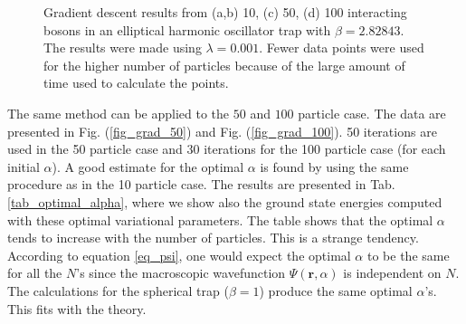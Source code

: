 \begin{figure}
{		}
\caption{Gradient descent results from (a,b) 10, (c) 50, (d) 100 interacting bosons in an elliptical harmonic oscillator trap with $\beta = 2.82843$. The results were made using $\lambda = 0.001$. Fewer data points were used for the higher number of particles because of the large amount of time used to calculate the points.}
\label{fig_grad_minima}
\end{figure}

The same method can be applied to the $50$ and $100$ particle case. The data are presented in Fig. (\ref{fig_grad_50}) and Fig. (\ref{fig_grad_100}). 50 iterations are used in the 50 particle case and 30 iterations for the 100 particle case (for each initial $\alpha$). A good estimate for the optimal $\alpha$ is found by using the same procedure as in the 10 particle case. The results are presented in Tab. \ref{tab_optimal_alpha}, where we show also the ground state energies computed with these optimal variational parameters. The table shows that the optimal $\alpha$ tends to increase with the number of particles. This is a strange tendency. According to equation \ref{eq_psi}, one would expect the optimal $\alpha$ to be the same for all the $N$'s since the macroscopic wavefunction $\Psi(\textbf{r}, \alpha)$ is independent on $N$. The calculations for the spherical trap ($\beta = 1$) produce the same optimal $\alpha$'s. This fits with the theory.

